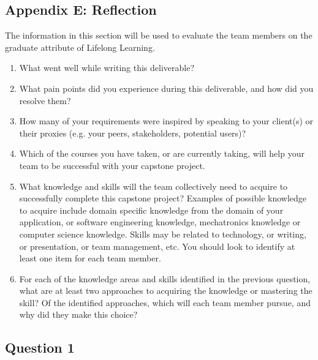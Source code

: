 \documentclass[12pt]{article}
\begin{document}
\subsection{Appendix E: Reflection}

The information in this section will be used to evaluate the team members on the
graduate attribute of Lifelong Learning.



\begin{enumerate}
\item What went well while writing this deliverable? 
  \item What pain points did you experience during this deliverable, and how did
  you resolve them?
  \item How many of your requirements were inspired by speaking to your
  client(s) or their proxies (e.g. your peers, stakeholders, potential users)?
  \item Which of the courses you have taken, or are currently taking, will help
  your team to be successful with your capstone project.
  \item What knowledge and skills will the team collectively need to acquire to
  successfully complete this capstone project?  Examples of possible knowledge
  to acquire include domain specific knowledge from the domain of your
  application, or software engineering knowledge, mechatronics knowledge or
  computer science knowledge.  Skills may be related to technology, or writing,
  or presentation, or team management, etc.  You should look to identify at
  least one item for each team member.
  \item For each of the knowledge areas and skills identified in the previous
  question, what are at least two approaches to acquiring the knowledge or
  mastering the skill?  Of the identified approaches, which will each team
  member pursue, and why did they make this choice?
\end{enumerate}

\subsection*{Question 1}
\end{document}
